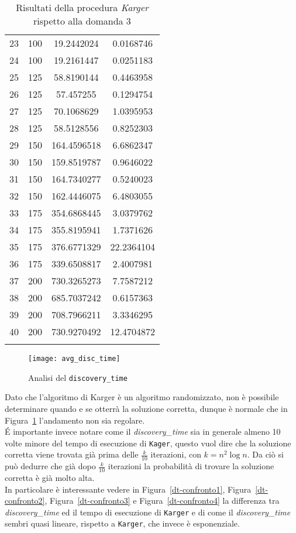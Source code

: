 \begin{center}
\begin{longtable}{|c|c|c|c|}
		23 & 100 & 19.2442024 & 0.0168746 \\		 
		24 & 100 & 19.2161447 & 0.0251183 \\		 
		25 & 125 & 58.8190144 & 0.4463958 \\	  
		26 & 125 & 57.457255 & 0.1294754 \\		
		27 & 125 & 70.1068629 & 1.0395953 \\		 
		28 & 125 & 58.5128556 & 0.8252303 \\		 
		29 & 150 & 164.4596518 & 6.6862347 \\	  
		30 & 150 & 159.8519787 & 0.9646022 \\	    
		31 & 150 & 164.7340277 & 0.5240023 \\		 
		32 & 150 & 162.4446075 & 6.4803055 \\		 
		33 & 175 & 354.6868445 & 3.0379762 \\		 
		34 & 175 & 355.8195941 & 1.7371626 \\	   	
		35 & 175 & 376.6771329 & 22.2364104 \\	  	 
		36 & 175 & 339.6508817 & 2.4007981 \\	 
		37 & 200 & 730.3265273 & 7.7587212 \\		 
		38 & 200 & 685.7037242 & 0.6157363 \\	  
		39 & 200 & 708.7966211 & 3.3346295 \\	  
		40 & 200 & 730.9270492 & 12.4704872 \\	
		\hline
		\caption{Risultati della procedura \textit{Karger} rispetto alla domanda 3}
		\label{dt-results}
	\end{longtable}
\end{center}\vspace{-40pt}

\begin{figure}[H]
	\centering
	\texttt{[image: avg\_disc\_time]}
	\caption{Analisi del \texttt{discovery\_time}}
	\label{dt-confronto}
\end{figure}

Dato che l'algoritmo di Karger è un algoritmo randomizzato, non è possibile determinare quando e se otterrà la soluzione corretta, dunque è normale che in Figura~\ref{dt-confronto} l'andamento non sia regolare.\\
\'E importante invece notare come il \textit{discovery\_time} sia in generale almeno 10 volte minore del tempo di esecuzione di \texttt{Kager}, questo vuol dire che la soluzione corretta viene trovata già prima delle $\frac{k}{10}$ iterazioni, con $k = n^2 \log n$. Da ciò si può dedurre che già dopo $\frac{k}{10}$ iterazioni la probabilità di trovare la soluzione corretta è già molto alta.\\
In particolare è interessante vedere in Figura~\ref{dt-confronto1}, Figura~\ref{dt-confronto2}, Figura~\ref{dt-confronto3} e Figura~\ref{dt-confronto4} la differenza tra \textit{discovery\_time} ed il tempo di esecuzione di \texttt{Karger} e di come il \textit{discovery\_time} sembri quasi lineare, rispetto a \texttt{Karger}, che invece è esponenziale.

